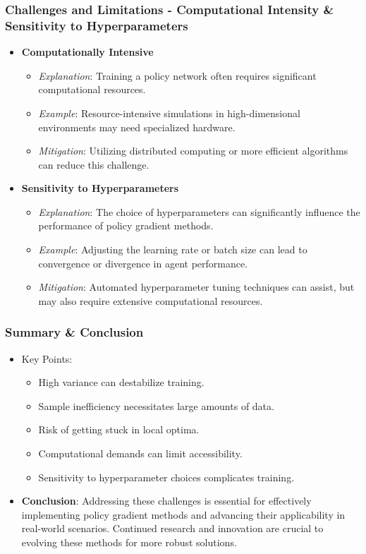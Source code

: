 \documentclass[aspectratio=169]{beamer}
\begin{document}
\begin{frame}[fragile]
    \frametitle{Challenges and Limitations - Computational Intensity & Sensitivity to Hyperparameters}
    \begin{itemize}
        \item \textbf{Computationally Intensive}
            \begin{itemize}
                \item \textit{Explanation}: Training a policy network often requires significant computational resources.
                \item \textit{Example}: Resource-intensive simulations in high-dimensional environments may need specialized hardware.
                \item \textit{Mitigation}: Utilizing distributed computing or more efficient algorithms can reduce this challenge.
            \end{itemize}

        \item \textbf{Sensitivity to Hyperparameters}
            \begin{itemize}
                \item \textit{Explanation}: The choice of hyperparameters can significantly influence the performance of policy gradient methods.
                \item \textit{Example}: Adjusting the learning rate or batch size can lead to convergence or divergence in agent performance.
                \item \textit{Mitigation}: Automated hyperparameter tuning techniques can assist, but may also require extensive computational resources.
            \end{itemize}
    \end{itemize}
\end{frame}

\begin{frame}[fragile]
    \frametitle{Summary & Conclusion}
    \begin{itemize}
        \item Key Points:
            \begin{itemize}
                \item High variance can destabilize training.
                \item Sample inefficiency necessitates large amounts of data.
                \item Risk of getting stuck in local optima.
                \item Computational demands can limit accessibility.
                \item Sensitivity to hyperparameter choices complicates training.
            \end{itemize}
        
        \item \textbf{Conclusion}: Addressing these challenges is essential for effectively implementing policy gradient methods and advancing their applicability in real-world scenarios. Continued research and innovation are crucial to evolving these methods for more robust solutions.
    \end{itemize}
\end{frame}
\end{document}
